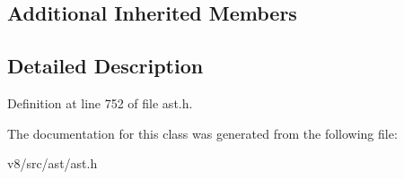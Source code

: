 \subsection*{Additional Inherited Members}


\subsection{Detailed Description}


Definition at line 752 of file ast.\+h.



The documentation for this class was generated from the following file\+:\begin{DoxyCompactItemize}
\item 
v8/src/ast/ast.\+h\end{DoxyCompactItemize}
